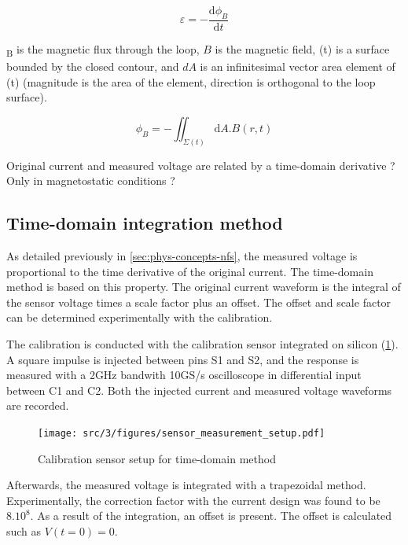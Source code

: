 \begin{equation} \label{eq:faraday}
  \varepsilon = - \frac{\mathrm{d} \phi _{B}}{\mathrm{d} t}
\end{equation}


\textPhi{}\textsubscript{B} is the magnetic flux through the loop, $B$ is the magnetic field, \textSigma{}(t) is a surface bounded by the closed contour,
and $dA$ is an infinitesimal vector area element of \textSigma{}(t) (magnitude is the area of the element, direction is orthogonal to the loop surface).

\begin{equation} \label{eq:phi}
  \phi _{B} = - \iint_{\Sigma(t)} \mathrm{d}A . B(r,t)
\end{equation}

Original current and measured voltage are related by a time-domain derivative ? Only in magnetostatic conditions ?

\subsection{Time-domain integration method}

As detailed previously in \ref{sec:phys-concepts-nfs}, the measured voltage is proportional to the time derivative of the original current.
The time-domain method is based on this property.
The original current waveform is the integral of the sensor voltage times a scale factor plus an offset.
The offset and scale factor can be determined experimentally with the calibration.

The calibration is conducted with the calibration sensor integrated on silicon (\ref{fig:calibration-sensor}).
A square impulse is injected between pins S1 and S2, and the response is measured with a 2GHz bandwith 10GS/s oscilloscope in differential input between C1 and C2.
Both the injected current and measured voltage waveforms are recorded.

\begin{figure}[!h]
  \centering
  \texttt{[image: src/3/figures/sensor\_measurement\_setup.pdf]}
  \caption{Calibration sensor setup for time-domain method}
  \label{fig:calibration-sensor}
\end{figure}

Afterwards, the measured voltage is integrated with a trapezoidal method.
Experimentally, the correction factor with the current design was found to be $8.10^8$.
As a result of the integration, an offset is present.
The offset is calculated such as $V(t=0) = 0.$

